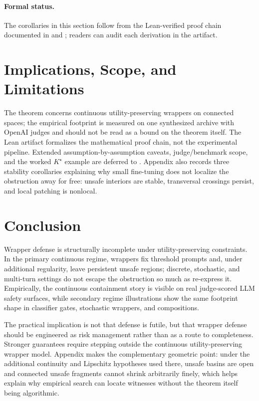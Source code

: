 \documentclass[11pt]{article}
\begin{document}
\paragraph{Formal status.}
The corollaries in this section follow from the Lean-verified proof
chain documented in  and
; readers can audit each derivation in
the artifact.


\section{Implications, Scope, and Limitations}
\label{sec:engineering}

The theorem concerns continuous utility-preserving wrappers on connected
spaces; the empirical footprint is measured on one synthesized archive
with OpenAI judges and should not be read as a bound on the theorem
itself. The Lean artifact formalizes the mathematical proof chain, not
the experimental pipeline. Extended assumption-by-assumption caveats,
judge/benchmark scope, and the worked $K^\star$ example are deferred to
. Appendix  also
records three stability corollaries explaining why small fine-tuning
does not localize the obstruction away for free: unsafe interiors are
stable, transversal crossings persist, and local patching is nonlocal.


\section{Conclusion}
\label{sec:conclusion}

Wrapper defense is structurally incomplete under utility-preserving
constraints. In the primary continuous regime, wrappers fix threshold
prompts and, under additional regularity, leave persistent unsafe
regions; discrete, stochastic, and multi-turn settings do not escape
the obstruction so much as re-express it. Empirically, the continuous
containment story is visible on real judge-scored LLM safety surfaces,
while secondary regime illustrations show the same footprint shape in
classifier gates, stochastic wrappers, and compositions.

The practical implication is not that defense is futile, but that
wrapper defense should be engineered as risk management rather than as a
route to completeness. Stronger guarantees require stepping outside the
continuous utility-preserving wrapper model. Appendix
 makes the complementary geometric point: under the
additional continuity and Lipschitz hypotheses used there, unsafe
basins are open and connected unsafe fragments cannot shrink
arbitrarily finely, which helps explain why empirical search can locate
witnesses without the theorem itself being algorithmic.
\end{document}
